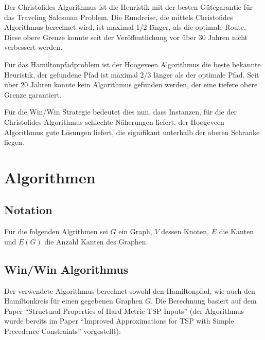 \documentclass[11pt,a4paper]{article}
\begin{document}
Der Christofides Algorithmus ist die Heuristik mit der besten Gütegarantie für das Traveling Salesman Problem. Die Rundreise, die mittels Christofides Algorithmus berechnet wird, ist maximal 1/2 länger, als die optimale Route. Diese obere Grenze konnte seit der Veröffentlichung vor über 30 Jahren nicht verbessert werden.

Für das Hamiltonpfadproblem ist der Hoogeveen Algorithmus die beste bekannte Heuristik, der gefundene Pfad ist maximal 2/3 länger als der optimale Pfad. Seit über 20 Jahren konnte kein Algorithmus gefunden werden, der eine tiefere obere Grenze garantiert.\cite{moemke11}

Für die Win/Win Strategie bedeutet dies nun, dass Instanzen, für die der Christofides Algorithmus schlechte Näherungen liefert, der Hoogeveen Algorithmus gute Lösungen liefert, die signifikant unterhalb der oberen Schranke liegen.

\newpage
\section{Algorithmen}
\label{s:algorithmen}
\subsection{Notation}
Für die folgenden Algrithmen sei $G$ ein Graph, $V$ dessen Knoten, $E$ die Kanten und $E(G)$ die Anzahl Kanten des Graphen.

\subsection{Win/Win Algorithmus}
Der verwendete Algorithmus berechnet sowohl den Hamiltonpfad, wie auch den Hamiltonkreis für einen gegebenen Graphen $G$. 
Die Berechnung basiert auf dem Paper "`Structural Properties of Hard Metric TSP Inputs"'\cite{moemke11} (der Algorithmus wurde bereits im Paper "`Improved Approximations for TSP with Simple Precedence Constraints"'\cite{boeckenhauer10} vorgestellt):
\end{document}
